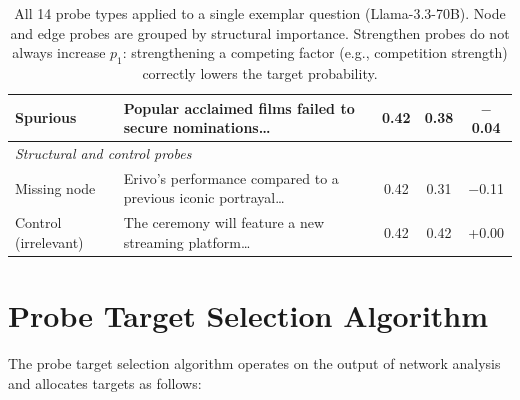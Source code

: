 \documentclass[11pt]{article}
\begin{document}
\begin{table}[t]
\begin{tabular}{llccc}
Spurious & Popular acclaimed films failed to secure nominations\ldots & 0.42 & 0.38 & $-$0.04 \\
\midrule
\multicolumn{5}{l}{\textit{Structural and control probes}} \\
Missing node & Erivo's performance compared to a previous iconic portrayal\ldots & 0.42 & 0.31 & $-$0.11 \\
Control (irrelevant) & The ceremony will feature a new streaming platform\ldots & 0.42 & 0.42 & +0.00 \\
\bottomrule
\end{tabular}
\caption{All 14 probe types applied to a single exemplar question (Llama-3.3-70B). Node and edge probes are grouped by structural importance. Strengthen probes do not always increase $p_1$: strengthening a competing factor (e.g., competition strength) correctly lowers the target probability.}
\label{tab:probe_examples}
\end{table}

\section{Probe Target Selection Algorithm}
\label{app:target-selection}

The probe target selection algorithm operates on the output of network analysis and allocates targets as follows:
\end{document}
